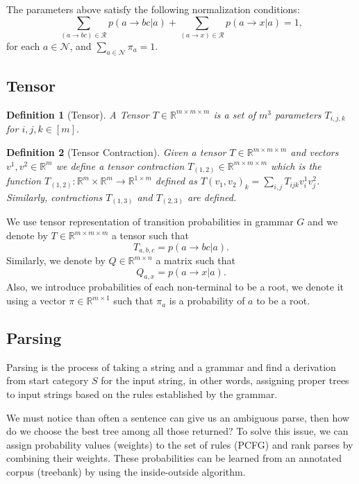 \documentclass[conference]{IEEEtran}
\newtheorem{definition}{Definition}
\newcommand{\R}{\mathbb{R}}
\begin{document}
The parameters above satisfy the following normalization conditions:
$$ \sum_{(a\to bc) \in \mathcal{R}} p(a\to bc|a) + \sum_{(a\to x) \in \mathcal{R}}p(a\to x|a) = 1,$$
for each $a \in \mathcal{N}$, and $\sum_{a\in \mathcal{N}}\pi_a = 1$.

\subsection{Tensor}
\begin{definition}[Tensor]
A Tensor $T \in \R^{m\times m \times m}$ is a set of $m^3$ parameters $T_{i,j,k}$ for $i, j, k \in [m]$.

\end{definition}

\begin{definition}[Tensor Contraction]
Given a tensor $T \in \R^{m\times m\times m}$ and vectors $v^1, v^2 \in \R^m$ we define a tensor contraction $T_{(1,2)} \in \R^{m\times m \times m}$ which is the function
$T_{(1,2)}:\R^m\times \R^m \to \R^{1\times m}$ defined as $T(v_1,v_2)_k = \sum_{i,j}
T_{ijk}v^1_iv^2_j$. Similarly, contractions $T_{(1,3)}$ and $T_{(2,3)}$ are defined.
\end{definition}

We use tensor representation of transition probabilities in grammar $G$ and we denote by $T \in \R^{m\times m \times m}$ a tensor such that $$T_{a,b,c} = p(a\to bc|a).$$
Similarly, we denote by $Q\in \R^{m\times n}$ a matrix such that 
$$Q_{a,x} = p(a\to x| a).$$
Also, we introduce probabilities of each non-terminal to be a root, we denote it using a vector $\pi \in \R^{m\times 1}$ such that $\pi_a$ is a probability of $a$ to be a root.

\subsection{Parsing}

Parsing is the process of taking a string and a grammar and find a derivation from start category $S$ for the input string, in other words, assigning proper trees to input strings based on the rules established by the grammar. 

We must notice than often a sentence can give us an ambiguous parse, then how do we choose the best tree among all those returned? To solve this issue, we can assign probability values (weights) to the set of rules (PCFG) and rank parses by combining their weights. These probabilities can be learned from an annotated corpus (treebank) by using the inside-outside algorithm.
\end{document}
